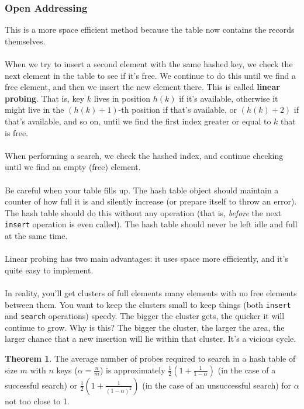 \documentclass[]{article}
\theoremstyle{definition}
\newtheorem*{theorem}{Theorem}
\begin{document}
			\subsubsection{Open Addressing}
				This is a more space efficient method because the table now contains the records themselves.
				\\ \\
				When we try to insert a second element with the same hashed key, we check the next element in the table to see if it's free. We continue to do this until we find a free element, and then we insert the new element there. This is called \textbf{linear probing}. That is, key $k$ lives in position $h(k)$ if it's available, otherwise it might live in the $(h(k) + 1)$-th position if that's available, or $(h(k) + 2)$ if that's available, and so on, until we find the first index greater or equal to $k$ that is free.
				\\ \\
				When performing a search, we check the hashed index, and continue checking until we find an empty (free) element.
				\\ \\
				Be careful when your table fills up. The hash table object should maintain a counter of how full it is and silently increase (or prepare itself to throw an error). The hash table should do this without any operation (that is, \emph{before} the next \verb+insert+ operation is even called). The hash table should never be left idle and full at the same time.
				\\ \\
				Linear probing has two main advantages: it uses space more efficiently, and it's quite easy to implement.
				\\ \\
				In reality, you'll get clusters of full elements \textendash{} many elements with no free elements between them. You want to keep the clusters small to keep things (both \verb+insert+ and \verb+search+ operations) speedy. The bigger the cluster gets, the quicker it will continue to grow. Why is this? The bigger the cluster, the larger the area, the larger chance that a new insertion will lie within that cluster. It's a vicious cycle.
				\begin{theorem}
					The average number of probes required to search in a hash table of size $m$ with $n$ keys ($\alpha = \frac{n}{m}$) is approximately $\frac{1}{2}\left(1 + \frac{1}{1 - \alpha}\right)$ (in the case of a successful search) or $\frac{1}{2}\left(1 + \frac{1}{(1 - \alpha)^2}\right)$ (in the case of an unsuccessful search) for $\alpha$ not too close to 1.
				\end{theorem}
\end{document}
